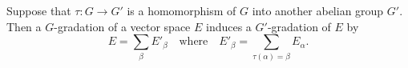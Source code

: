 Suppose that $\tau: G \rightarrow G'$ is a homomorphism of $G$ into another abelian group $G'$. Then a $G$-gradation of a vector space $E$ induces a $G'$-gradation of $E$ by
$$E = \sum_{\beta} E'_{\beta} \quad \text{where} \quad E'_{\beta} = \sum_{\tau(\alpha) = \beta} E_{\alpha}.$$
